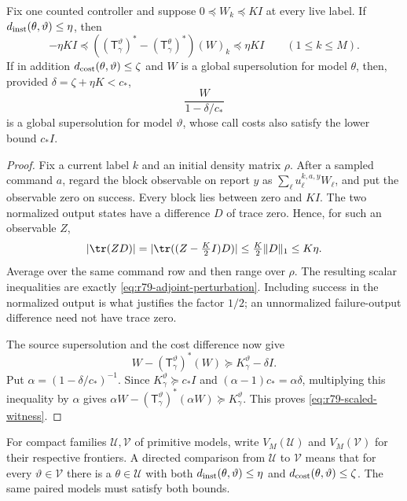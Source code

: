 \begin{lemma}
\label{lem:r79-centered-perturbation}
Fix one counted controller and suppose
$0\preccurlyeq W_k\preccurlyeq KI$ at every live label.  If
$d_{\rm inst}(\theta,\vartheta)\le\eta$, then
\begin{equation}\label{eq:r79-adjoint-perturbation}
 -\eta KI\preccurlyeq
   ((\mathsf T^\vartheta_\gamma)^*
       -(\mathsf T^\theta_\gamma)^*)(W)_k
                  \preccurlyeq\eta KI
 \qquad(1\le k\le M).
\end{equation}
If in addition $d_{\rm cost}(\theta,\vartheta)\le\zeta$ and $W$
is a global supersolution for model $\theta$, then, provided
$\delta=\zeta+\eta K<c_*$,
\begin{equation}\label{eq:r79-scaled-witness}
 \frac{W}{1-\delta/c_*}
\end{equation}
is a global supersolution for model $\vartheta$, whose call costs
also satisfy the lower bound $c_*I$.
\end{lemma}
\begin{proof}
Fix a current label $k$ and an initial density matrix $\rho$.
After a sampled command $a$, regard the block observable on report
$y$ as $\sum_\ell u^{k,a,y}_\ell W_\ell$, and put the observable
zero on success.  Every block lies between zero and $KI$.
The two normalized output states have a difference $D$ of trace
zero.  Hence, for such an observable $Z$,
\[
 |\tr(ZD)|
   =|\tr((Z-\tfrac K2 I)D)|
   \le\tfrac K2\|D\|_1\le K\eta.
\]
Average over the same command row and then range over $\rho$.
The resulting scalar inequalities are exactly
\eqref{eq:r79-adjoint-perturbation}.  Including success in the
normalized output is what justifies the factor $1/2$; an
unnormalized failure-output difference need not have trace zero.

The source supersolution and the cost difference now give
\[
 W-(\mathsf T^\vartheta_\gamma)^*(W)
       \succeq K^\vartheta_\gamma-\delta I.
\]
Put $\alpha=(1-\delta/c_*)^{-1}$.  Since
$K^\vartheta_\gamma\succeq c_*I$ and
$(\alpha-1)c_* =\alpha\delta$, multiplying this inequality by
$\alpha$ gives
$\alpha W-(\mathsf T^\vartheta_\gamma)^*(\alpha W)
 \succeq K^\vartheta_\gamma$.
This proves \eqref{eq:r79-scaled-witness}.
\end{proof}

For compact families $\mathcal U,\mathcal V$ of primitive models,
write $V_M(\mathcal U)$ and $V_M(\mathcal V)$ for their respective
frontiers.  A directed comparison from $\mathcal U$ to $\mathcal V$
means that for every $\vartheta\in\mathcal V$ there is a
$\theta\in\mathcal U$ with both
$d_{\rm inst}(\theta,\vartheta)\le\eta$ and
$d_{\rm cost}(\theta,\vartheta)\le\zeta$.  The same paired models
must satisfy both bounds.

